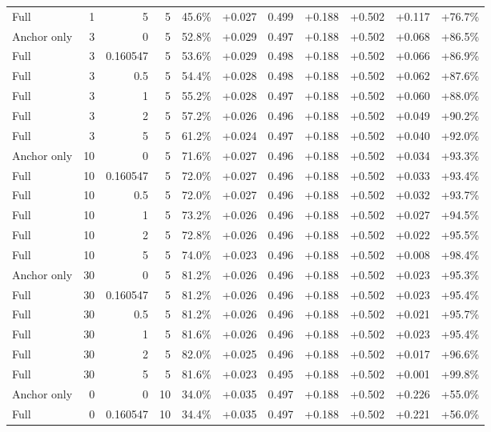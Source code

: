 \begin{table}[htbp]
\begin{tabular}{lrrrccccccc}
Full & 1 & 5 & 5 & 45.6\% & +0.027 & 0.499 & +0.188 & +0.502 & +0.117 & +76.7\% \\
Anchor only & 3 & 0 & 5 & 52.8\% & +0.029 & 0.497 & +0.188 & +0.502 & +0.068 & +86.5\% \\
Full & 3 & 0.160547 & 5 & 53.6\% & +0.029 & 0.498 & +0.188 & +0.502 & +0.066 & +86.9\% \\
Full & 3 & 0.5 & 5 & 54.4\% & +0.028 & 0.498 & +0.188 & +0.502 & +0.062 & +87.6\% \\
Full & 3 & 1 & 5 & 55.2\% & +0.028 & 0.497 & +0.188 & +0.502 & +0.060 & +88.0\% \\
Full & 3 & 2 & 5 & 57.2\% & +0.026 & 0.496 & +0.188 & +0.502 & +0.049 & +90.2\% \\
Full & 3 & 5 & 5 & 61.2\% & +0.024 & 0.497 & +0.188 & +0.502 & +0.040 & +92.0\% \\
Anchor only & 10 & 0 & 5 & 71.6\% & +0.027 & 0.496 & +0.188 & +0.502 & +0.034 & +93.3\% \\
Full & 10 & 0.160547 & 5 & 72.0\% & +0.027 & 0.496 & +0.188 & +0.502 & +0.033 & +93.4\% \\
Full & 10 & 0.5 & 5 & 72.0\% & +0.027 & 0.496 & +0.188 & +0.502 & +0.032 & +93.7\% \\
Full & 10 & 1 & 5 & 73.2\% & +0.026 & 0.496 & +0.188 & +0.502 & +0.027 & +94.5\% \\
Full & 10 & 2 & 5 & 72.8\% & +0.026 & 0.496 & +0.188 & +0.502 & +0.022 & +95.5\% \\
Full & 10 & 5 & 5 & 74.0\% & +0.023 & 0.496 & +0.188 & +0.502 & +0.008 & +98.4\% \\
Anchor only & 30 & 0 & 5 & 81.2\% & +0.026 & 0.496 & +0.188 & +0.502 & +0.023 & +95.3\% \\
Full & 30 & 0.160547 & 5 & 81.2\% & +0.026 & 0.496 & +0.188 & +0.502 & +0.023 & +95.4\% \\
Full & 30 & 0.5 & 5 & 81.2\% & +0.026 & 0.496 & +0.188 & +0.502 & +0.021 & +95.7\% \\
Full & 30 & 1 & 5 & 81.6\% & +0.026 & 0.496 & +0.188 & +0.502 & +0.023 & +95.4\% \\
Full & 30 & 2 & 5 & 82.0\% & +0.025 & 0.496 & +0.188 & +0.502 & +0.017 & +96.6\% \\
Full & 30 & 5 & 5 & 81.6\% & +0.023 & 0.495 & +0.188 & +0.502 & +0.001 & +99.8\% \\
Anchor only & 0 & 0 & 10 & 34.0\% & +0.035 & 0.497 & +0.188 & +0.502 & +0.226 & +55.0\% \\
Full & 0 & 0.160547 & 10 & 34.4\% & +0.035 & 0.497 & +0.188 & +0.502 & +0.221 & +56.0\% \\

\end{tabular}
\end{table}
